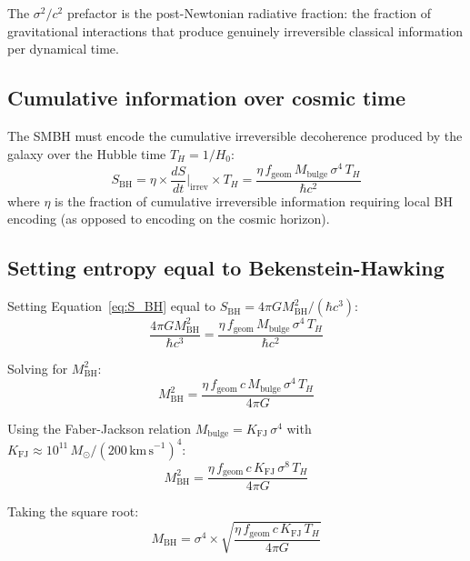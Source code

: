 \documentclass[12pt,a4paper]{article}
\begin{document}
The $\sigma^2/c^2$ prefactor is the post-Newtonian radiative fraction: the fraction
of gravitational interactions that produce genuinely irreversible classical
information per dynamical time.

\subsection{Cumulative information over cosmic time}

The SMBH must encode the cumulative irreversible decoherence produced by the galaxy
over the Hubble time $T_H = 1/H_0$:
\begin{equation}
S_\mathrm{BH} = \eta \times \frac{dS}{dt}\bigg|_\mathrm{irrev} \times T_H
= \frac{\eta\, f_\mathrm{geom}\, M_\mathrm{bulge}\, \sigma^4\, T_H}{\hbar c^2}
\label{eq:S_BH}
\end{equation}
where $\eta$ is the fraction of cumulative irreversible information requiring local
BH encoding (as opposed to encoding on the cosmic horizon).

\subsection{Setting entropy equal to Bekenstein-Hawking}

Setting Equation~\ref{eq:S_BH} equal to $S_\mathrm{BH} = 4\pi G M_\mathrm{BH}^2/(\hbar c^3)$:
\begin{equation}
\frac{4\pi G M_\mathrm{BH}^2}{\hbar c^3} = \frac{\eta\, f_\mathrm{geom}\, M_\mathrm{bulge}\, \sigma^4\, T_H}{\hbar c^2}
\end{equation}

Solving for $M_\mathrm{BH}^2$:
\begin{equation}
M_\mathrm{BH}^2 = \frac{\eta\, f_\mathrm{geom}\, c\, M_\mathrm{bulge}\, \sigma^4\, T_H}{4\pi G}
\end{equation}

Using the Faber-Jackson relation $M_\mathrm{bulge} = K_\mathrm{FJ}\,\sigma^4$ with
$K_\mathrm{FJ} \approx 10^{11}\,M_\odot/(200\,\mathrm{km\,s}^{-1})^4$:
\begin{equation}
M_\mathrm{BH}^2 = \frac{\eta\, f_\mathrm{geom}\, c\, K_\mathrm{FJ}\, \sigma^8\, T_H}{4\pi G}
\end{equation}

Taking the square root:
\begin{equation}
\boxed{M_\mathrm{BH} = \sigma^4 \times \sqrt{\frac{\eta\, f_\mathrm{geom}\, c\, K_\mathrm{FJ}\, T_H}{4\pi G}}}
\label{eq:msigma}
\end{equation}
\end{document}
